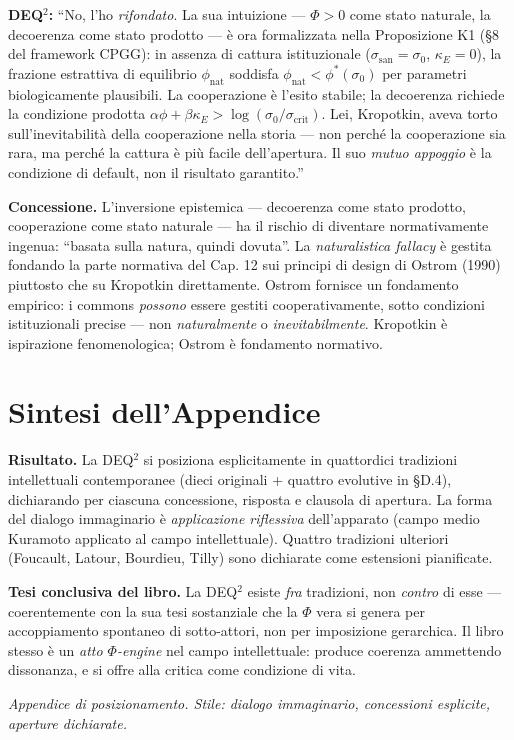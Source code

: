 \textbf{DEQ$^2$:} ``No, l'ho \emph{rifondato}. La sua intuizione ---
$\Phi > 0$ come stato naturale, la decoerenza come stato prodotto --- è
ora formalizzata nella Proposizione K1 (§8 del framework CPGG): in
assenza di cattura istituzionale ($\sigma_{\text{san}} = \sigma_0$,
$\kappa_E = 0$), la frazione estrattiva di equilibrio $\phi_{\text{nat}}$
soddisfa $\phi_{\text{nat}} < \phi^*(\sigma_0)$ per parametri
biologicamente plausibili. La cooperazione è l'esito stabile; la
decoerenza richiede la condizione prodotta $\alpha\phi + \beta\kappa_E >
\log(\sigma_0/\sigma_{\text{crit}})$. Lei, Kropotkin, aveva torto
sull'inevitabilità della cooperazione nella storia --- non perché la
cooperazione sia rara, ma perché la cattura è più facile dell'apertura.
Il suo \emph{mutuo appoggio} è la condizione di default, non il
risultato garantito.''

\textbf{Concessione.} L'inversione epistemica --- decoerenza come stato
prodotto, cooperazione come stato naturale --- ha il rischio di diventare
normativamente ingenua: ``basata sulla natura, quindi dovuta''. La
\emph{naturalistica fallacy} è gestita fondando la parte normativa del
Cap. 12 sui principi di design di Ostrom (1990) piuttosto che su
Kropotkin direttamente. Ostrom fornisce un fondamento empirico: i commons
\emph{possono} essere gestiti cooperativamente, sotto condizioni
istituzionali precise --- non \emph{naturalmente} o \emph{inevitabilmente}.
Kropotkin è ispirazione fenomenologica; Ostrom è fondamento normativo.



\section{Sintesi dell'Appendice}\label{sintesi-dellappendice}

\Proved{} \textbf{Risultato.} La DEQ$^2$ si posiziona esplicitamente in
quattordici tradizioni intellettuali contemporanee (dieci originali +
quattro evolutive in §D.4), dichiarando per ciascuna concessione, risposta
e clausola di apertura. La forma del dialogo immaginario è
\emph{applicazione riflessiva} dell'apparato (campo medio Kuramoto
applicato al campo intellettuale). Quattro tradizioni ulteriori (Foucault,
Latour, Bourdieu, Tilly) sono dichiarate come estensioni pianificate.

\Hypoth{} \textbf{Tesi conclusiva del libro.} La DEQ$^2$ esiste \emph{fra}
tradizioni, non \emph{contro} di esse --- coerentemente con la sua tesi
sostanziale che la \(\Phi\) vera si genera per accoppiamento spontaneo
di sotto-attori, non per imposizione gerarchica. Il libro stesso è un
\emph{atto \(\Phi\)-engine} nel campo intellettuale: produce coerenza
ammettendo dissonanza, e si offre alla critica come condizione di vita.



\emph{Appendice di posizionamento. Stile: dialogo immaginario,
concessioni esplicite, aperture dichiarate.}
